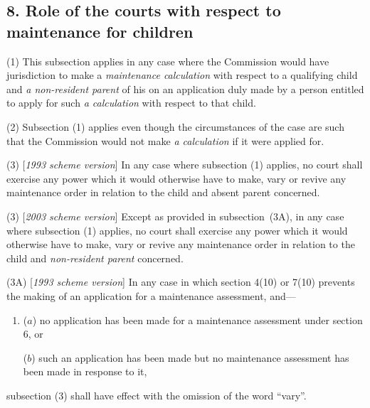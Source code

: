\documentclass[12pt,a4paper]{article}
\begin{document}
\subsection{8. Role of the courts with respect to maintenance for children}

(1) This subsection applies in any case where 
the 
Commission  %
would have jurisdiction to make a 
\emph{maintenance calculation}  %
with respect to a qualifying child and 
\emph{a non-resident parent}  %
of his on an application duly made 
by a person entitled to apply for such 
\emph{a calculation}  %
with respect to that child.

(2) Subsection (1)  applies even though the circumstances of the case are such that
the 
Commission  %
would not make 
\emph{a calculation}  %
if it were applied for.

(3) [\emph{1993 scheme version}] In any case where subsection (1)  applies, no court shall exercise any power which it would otherwise have to make, vary or revive any maintenance order in relation to the child and absent parent concerned.

(3) [\emph{2003 scheme version}] 
Except as provided in subsection~(3A),  %
in any case where subsection (1)  applies, no court shall exercise any power which it would otherwise have to make, vary or revive any maintenance order in relation to the child and 
\emph{non-resident parent}  %
concerned.

(3A) [\emph{1993 scheme version}] In any case in which section 4(10) or 7(10) prevents the making of an application for a maintenance assessment, and—
\begin{enumerate}\item[]
($a$) no application has been made for a maintenance assessment under section 6, or

($b$) such an application has been made but no maintenance assessment has been made in response to it,
\end{enumerate}
subsection (3) shall have effect with the omission of the word “vary”.
\end{document}
